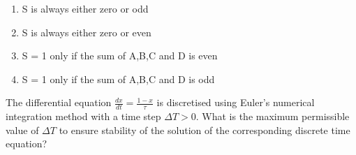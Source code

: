 \begin{enumerate}

        \item S is always either zero or odd
        \item S is always either zero or even
        \item S = 1 only if the sum of A,B,C and D is even 
        \item S = 1 only if the sum of A,B,C and D is odd
\end{enumerate}
\bigskip
\item The differential equation $\frac{dx}{dt}=\frac{1-x}{\tau}$ is discretised using Euler's numerical integration method with a time step $\Delta T > 0$. What is the maximum permissible value of $\Delta T$ to ensure stability of the solution of the corresponding discrete time equation?

